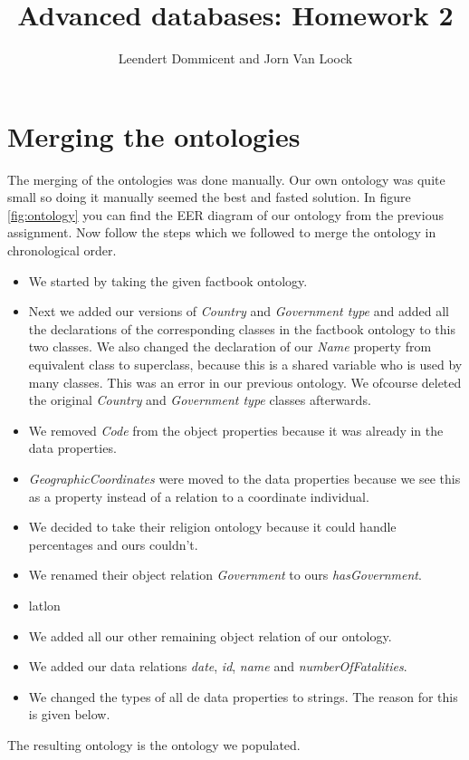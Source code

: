 \documentclass{article}
\title{Advanced databases: Homework 2}
\author{Leendert Dommicent and Jorn Van Loock}
\begin{document}
\maketitle
\section{Merging the ontologies}
The merging of the ontologies was done manually. Our own ontology was quite small so doing it manually seemed the best and fasted solution. In figure \ref{fig:ontology} you can find the EER diagram of our ontology from the previous assignment. Now follow the steps which we followed to merge the ontology in chronological order.
\begin{itemize}
\item We started by taking the given factbook ontology.
\item Next we added our versions of \textit{Country} and \textit{Government type} and added all the declarations of the corresponding classes in the factbook ontology to this two classes. We also changed the declaration of our \textit{Name} property from equivalent class to superclass, because this is a shared variable who is used by many classes. This was an error in our previous ontology. We ofcourse deleted the original \textit{Country} and \textit{Government type} classes afterwards.
\item We removed \textit{Code} from the object properties because it was already in the data properties.
\item \textit{GeographicCoordinates} were moved to the data properties because we see this as a property instead of a relation to a coordinate individual.
\item We decided to take their religion ontology because it could handle percentages and ours couldn't.
\item We renamed their object relation \textit{Government} to ours \textit{hasGovernment}.
\item latlon
\item We added all our other remaining object relation of our ontology.
\item We added our data relations \textit{date}, \textit{id}, \textit{name} and \textit{numberOfFatalities}.
\item We changed the types of all de data properties to strings. The reason for this is given below.
\end{itemize}
The resulting ontology is the ontology we populated.
\end{document}
